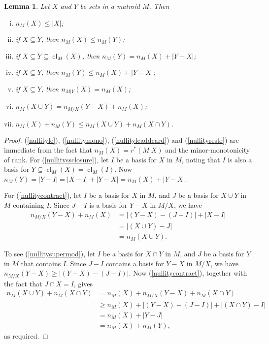 \documentclass{amsart}
\theoremstyle{plain}
\newtheorem{lemma}[theorem]{Lemma}
\theoremstyle{definition}
\DeclareMathOperator{\cl}{cl}
\newcommand{\con}{/}
\newcommand{\abs}[1]{\left| #1 \right|}
\renewcommand{\le}{\leqslant}
\renewcommand{\ge}{\geqslant}
\renewcommand{\ss}{\subseteq}
\begin{document}
\begin{lemma}\label{nullityprop}
  Let $X$ and $Y$ be sets in a matroid $M$. Then
  \begin{enumerate}[(i)]
    \item\label{nullityle} $n_M(X) \le |X|$;
    \item\label{nullitymono} if $X \ss Y$, then $n_M(X) \le n_M(Y)$;
    \item\label{nullityssclosure} if $X \ss Y \ss \cl_M(X)$, then $n_M(Y) = n_M(X) + |Y-X|$;
    \item\label{nullityleaddcard} if $X \ss Y$, then $n_M(Y) \le n_M(X) + |Y-X|$;
    \item\label{nullityrestr} if $X \ss Y$, then $n_{M | Y}(X) = n_M(X)$;
    \item\label{nullitycontract} $n_M(X \cup Y) = n_{M \con X}(Y-X) + n_M(X)$;
    \item\label{nullitysupermod} $n_M(X) + n_M(Y) \le n_M(X \cup Y) + n_M(X \cap Y)$. 
  \end{enumerate}
\end{lemma}
\begin{proof}
  (\ref{nullityle}), (\ref{nullitymono}), (\ref{nullityleaddcard}) and (\ref{nullityrestr}) 
  are immediate from the fact that $n_M(X) = r^*(M | X)$ and the minor-monotonicity of rank. 
  For (\ref{nullityssclosure}), let $I$ be a basis for $X$ in $M$, 
  noting that $I$ is also a basis for $Y \ss \cl_M(X) = \cl_M(I)$. 
  Now $n_M(Y) = |Y - I| = |X - I| + |Y-X| = n_M(X) + |Y-X|$. 


  For (\ref{nullitycontract}), let $I$ be a basis for $X$ in $M$, and $J$ be a 
  basis for $X \cup Y$ in $M$ containing $I$. Since $J - I$ is a basis for 
  $Y-X$ in $M \con X$, we have
  \begin{align*}
    n_{M \con X}(Y-X) + n_M(X) &= \abs{(Y-X)-(J-I)} + \abs{X-I} \\
    &= |(X \cup Y) - J| \\ 
    &= n_M(X \cup Y).
  \end{align*}

  To see (\ref{nullitysupermod}), let $I$ be a basis for $X \cap Y$ in $M$, 
  and $J$ be a basis for $Y$ in $M$ that contains $I$.  
  Since $J - I$ contains a basis for $Y-X$ in $M \con X$, we have
  $n_{M \con X}(Y-X) \ge |(Y-X) - (J - I)|$. Now (\ref{nullitycontract}), 
  together with the fact that $J \cap X = I$, gives
  \begin{align*}
    n_M(X \cup Y) + n_M(X \cap Y) &= n_M(X) + n_{M \con X}(Y-X) + n_M(X \cap Y) \\
    &\ge n_M(X) + |(Y-X) - (J-I)| + |(X \cap Y) - I|\\
    &= n_M(X) + |Y-J| \\
    &= n_M(X) + n_M(Y),
  \end{align*}
  as required. 
\end{proof}
\end{document}
